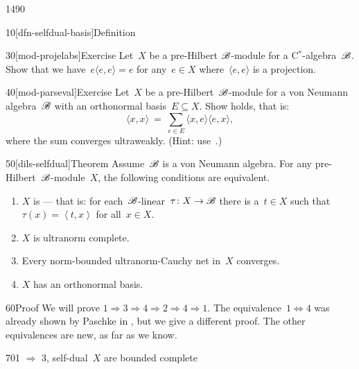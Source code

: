 \begin{parsec}{1490}
\begin{point}{10}[dfn-selfdual-basis]{Definition}
\end{point}
\begin{point}{30}[mod-projelabs]{Exercise}%
Let~$X$ be a pre-Hilbert $\mathscr{B}$-module for a C$^*$-algebra~$\mathscr{B}$.
Show that we have~$ e \langle e,e \rangle = e$
    for any~$e \in X$
   where~$\langle e, e\rangle$ is a projection.
\end{point}
\begin{point}{40}[mod-parseval]{Exercise}
Let~$X$ be a pre-Hilbert~$\mathscr{B}$-module for a von Neumann algebra~$\mathscr{B}$
    with an orthonormal basis~$E \subseteq X$.
    Show  holds, that is:
\begin{equation*}
    \langle x, x \rangle \ =\ 
    \sum_{e \in E} \langle x, e\rangle \langle e, x\rangle,
\end{equation*}
where the sum converges ultraweakly.
(Hint: use~.)
\end{point}
\begin{point}{50}[dils-selfdual]{Theorem}%
    Assume~$\mathscr{B}$ is a von Neumann algebra.
    For any pre-Hilbert~$\mathscr{B}$-module~$X$,
        the following conditions are equivalent.
        \begin{enumerate}
            \item $X$ is  ---
                that is: for each~$\mathscr{B}$-linear~$\tau\colon X \to \mathscr{B}$
                there is a~$t \in X$ such that~$\tau(x) = \left<t,x\right>$
                    for all~$x \in X$.
            \item $X$ is ultranorm complete.
            \item Every norm-bounded ultranorm-Cauchy net in~$X$ converges.
            \item $X$ has an orthonormal basis.
        \end{enumerate}
\begin{point}{60}{Proof}%
We will prove $1 \Rightarrow 3 \Rightarrow 4 \Rightarrow 2 \Rightarrow 4 \Rightarrow 1$.
The equivalence~$1 \Leftrightarrow 4$
    was already shown by Paschke in \cite[Thm.~3.12]{paschke},
    but we give a different proof. The other equivalences are new,
    as far as we know.
\begin{point}{70}{1 $\Rightarrow$ 3, self-dual~$X$ are bounded complete}%

\end{point}
\end{point}
\end{point}
\end{parsec}
